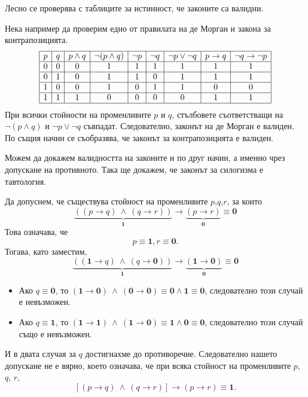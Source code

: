Лесно се проверява с таблиците за истинност, че законите са валидни.

\begin{example}
  Нека например да проверим едно от правилата на де Морган и закона
  за контрапозицията.
  \[
  \begin{array}{|c|c|c|c|c|c|c|c|c|}
    \hline
    p & q & p\wedge q & \neg(p\wedge q) & \neg p & \neg q & \neg p \vee \neg q & p \rightarrow q & \neg q \rightarrow \neg p\\
    \hline
    0 & 0 & 0 & 1 & 1 & 1 & 1 & 1 & 1 \\
    \hline
    0 & 1 & 0 & 1 & 1 & 0 & 1 & 1 & 1 \\
    \hline
    1 & 0 & 0 & 1 & 0 & 1 & 1 & 0 & 0 \\
    \hline
    1 & 1 & 1 & 0 & 0 & 0 & 0 & 1 & 1 \\
    \hline
  \end{array}
  \]
  При всички стойности на променливите $p$ и $q$, стълбовете съответстващи на $\neg(p \wedge q)$ и $\neg p \vee \neg q$
  съвпадат. %
  Следователно, законът на де Морган е валиден.
  По същия начин се съобразява, че законът за контрапозицията е валиден.
\end{example}

\begin{example}
  Можем да докажем валидността на законите и по друг начин, а именно чрез допускане на противното.
  Така ще докажем, че законът за силогизма е тавтология.
  
  Да допуснем, че съществува стойност на променливите $p$,$q$,$r$, за които
  \[\underbrace{((p\rightarrow q)\ \wedge\ (q\rightarrow r))}_{\mathbf{1}} \rightarrow \underbrace{(p\rightarrow r)}_{\mathbf{0}} \equiv {\mathbf 0}\]
  Това означава, че
  \[p \equiv \mathbf{1}, r \equiv \mathbf{0}.\]
  Тогава, като заместим,
  \[\underbrace{((\mathbf{1}\rightarrow q)\ \wedge\ (q\rightarrow \mathbf{0}))}_{\mathbf{1}} \rightarrow \underbrace{(\mathbf{1}\rightarrow \mathbf{0})}_{\mathbf{0}} \equiv {\mathbf 0}\]
  \begin{itemize}
  \item 
    Ако $q \equiv \mathbf{0}$, то $(\mathbf{1}\rightarrow \mathbf{0})\ \wedge\ (\mathbf{0}\rightarrow \mathbf{0}) \equiv \mathbf{0} \wedge \mathbf{1} \equiv \mathbf{0}$,
    следователно този случай е невъзможен.
  \item
    Ако $q \equiv \mathbf{1}$, то $(\mathbf{1}\rightarrow \mathbf{1})\ \wedge\ (\mathbf{1}\rightarrow \mathbf{0}) \equiv \mathbf{1} \wedge \mathbf{0} \equiv \mathbf{0}$,
    следователно този случай също е невъзможен.
  \end{itemize}
  И в двата случая за $q$ достигнахме до противоречие.
  Следователно нашето допускане не е вярно, което означава, че
  при всяка стойност на променливите $p$, $q$, $r$,
  \[[(p\rightarrow q)\ \wedge\ (q\rightarrow r)] \rightarrow (p\rightarrow r) \equiv {\mathbf 1}.\]
\end{example}


